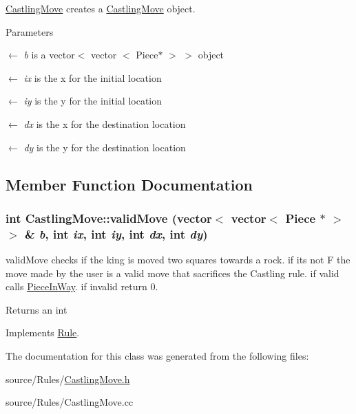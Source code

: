 \hyperlink{classCastlingMove}{CastlingMove} creates a \hyperlink{classCastlingMove}{CastlingMove} object. 
\begin{DoxyParams}{Parameters}
\item[\mbox{$\leftarrow$} {\em b}]is a vector$<$ vector $<$ Piece$\ast$ $>$ $>$ object \item[\mbox{$\leftarrow$} {\em ix}]is the x for the initial location \item[\mbox{$\leftarrow$} {\em iy}]is the y for the initial location \item[\mbox{$\leftarrow$} {\em dx}]is the x for the destination location \item[\mbox{$\leftarrow$} {\em dy}]is the y for the destination location \end{DoxyParams}


\subsection{Member Function Documentation}
\hypertarget{classCastlingMove_ad716f6021188a950d53b824bcdfdcb0d}{
\subsubsection[{validMove}]{\setlength{\rightskip}{0pt plus 5cm}int CastlingMove::validMove (vector$<$ vector$<$ {\bf Piece} $\ast$ $>$ $>$ \& {\em b}, \/  int {\em ix}, \/  int {\em iy}, \/  int {\em dx}, \/  int {\em dy})}}
\label{classCastlingMove_ad716f6021188a950d53b824bcdfdcb0d}


validMove checks if the king is moved two squares towards a rock. if its not F the move made by the user is a valid move that sacrifices the Castling rule. if valid calls \hyperlink{classPieceInWay}{PieceInWay}. if invalid return 0. \begin{DoxyReturn}{Returns}
an int 
\end{DoxyReturn}


Implements \hyperlink{classRule}{Rule}.

The documentation for this class was generated from the following files:\begin{DoxyCompactItemize}
\item 
source/Rules/\hyperlink{CastlingMove_8h}{CastlingMove.h}\item 
source/Rules/CastlingMove.cc\end{DoxyCompactItemize}
